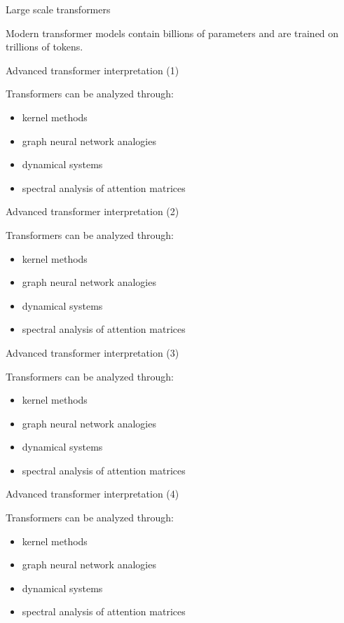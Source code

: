 \documentclass[aspectratio=169]{beamer}
\begin{document}
\begin{frame}{Large scale transformers}

Modern transformer models contain billions of parameters
and are trained on trillions of tokens.

\end{frame}


\begin{frame}{Advanced transformer interpretation (1)}

Transformers can be analyzed through:

\begin{itemize}
\item kernel methods
\item graph neural network analogies
\item dynamical systems
\item spectral analysis of attention matrices
\end{itemize}

\end{frame}


\begin{frame}{Advanced transformer interpretation (2)}

Transformers can be analyzed through:

\begin{itemize}
\item kernel methods
\item graph neural network analogies
\item dynamical systems
\item spectral analysis of attention matrices
\end{itemize}

\end{frame}


\begin{frame}{Advanced transformer interpretation (3)}

Transformers can be analyzed through:

\begin{itemize}
\item kernel methods
\item graph neural network analogies
\item dynamical systems
\item spectral analysis of attention matrices
\end{itemize}

\end{frame}


\begin{frame}{Advanced transformer interpretation (4)}

Transformers can be analyzed through:

\begin{itemize}
\item kernel methods
\item graph neural network analogies
\item dynamical systems
\item spectral analysis of attention matrices
\end{itemize}

\end{frame}
\end{document}
